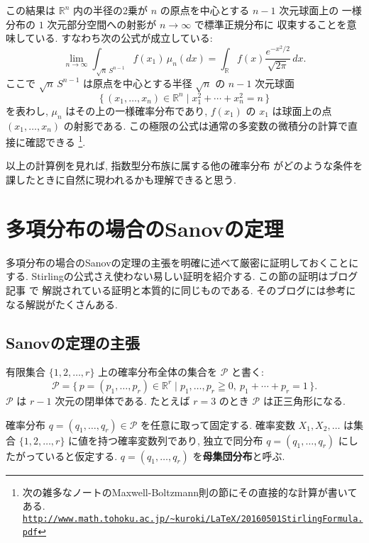 \documentclass[12pt,twoside]{jarticle}
\newcommand\R{{\mathbb R}} %
\newcommand\cP{{\mathcal P}}
\theoremstyle{definition} %
\theoremstyle{definition} %
\theoremstyle{definition} %
\numberwithin{theorem}{section}
\numberwithin{equation}{section}
\numberwithin{figure}{section}
\numberwithin{table}{section}
\begin{document}
この結果は $\R^n$ 内の半径の2乗が $n$ の原点を中心とする $n-1$ 次元球面上の
一様分布の $1$ 次元部分空間への射影が $n\to\infty$ で標準正規分布に
収束することを意味している. すなわち次の公式が成立している:
\[
\lim_{n\to\infty}\int_{\sqrt{n}\,S^{n-1}} f(x_1)\,\mu_n(dx)
=\int_\R f(x)\frac{e^{-x^2/2}}{\sqrt{2\pi}}\,dx.
\]
ここで $\sqrt{n}\,S^{n-1}$ は原点を中心とする半径 $\sqrt{n}$ の $n-1$ 次元球面
\[
\{\,(x_1,\ldots,x_n)\in\R^n\mid x_1^2+\cdots+x_n^2=n\,\}
\]
を表わし, $\mu_n$ はその上の一様確率分布であり, 
$f(x_1)$ の $x_1$ は球面上の点 $(x_1,\ldots,x_n)$ の射影である.
この極限の公式は通常の多変数の微積分の計算で直接に確認できる%
\footnote{次の雑多なノートのMaxwell-Boltzmann則の節にその直接的な計算が書いてある. \\
\href{http://www.math.tohoku.ac.jp/~kuroki/LaTeX/20160501StirlingFormula.pdf}
{\tt http://www.math.tohoku.ac.jp/{\textasciitilde}kuroki/LaTeX/20160501StirlingFormula.pdf}}.

以上の計算例を見れば, 指数型分布族に属する他の確率分布
がどのような条件を課したときに自然に現われるかも理解できると思う.


\section{多項分布の場合のSanovの定理}
\label{sec:Sanov}

多項分布の場合のSanovの定理の主張を明確に述べて厳密に証明しておくことにする.
Stirlingの公式さえ使わない易しい証明を紹介する.
この節の証明はブログ記事 \cite{vanRamon2013} で
解説されている証明と本質的に同じものである.
そのブログには参考になる解説がたくさんある.


\subsection{Sanovの定理の主張}


有限集合 $\{1,2,\ldots,r\}$ 上の確率分布全体の集合を $\cP$ と書く:
\[
\cP = \{\,p=(p_1,\ldots,p_r)\in\R^r\mid p_1,\ldots,p_r\geqq 0,\ p_1+\cdots+p_r=1 \,\}.
\]
$\cP$ は $r-1$ 次元の閉単体である.
たとえば $r=3$ のとき $\cP$ は正三角形になる.

確率分布 $q=(q_1,\ldots,q_r)\in\cP$ を任意に取って固定する.
確率変数 $X_1,X_2,\ldots$ は集合 $\{1,2,\ldots,r\}$ に値を持つ確率変数列であり, 
独立で同分布 $q=(q_1,\ldots,q_r)$ にしたがっていると仮定する.
$q=(q_1,\ldots,q_r)$ を{\bf 母集団分布}と呼ぶ.
\end{document}
